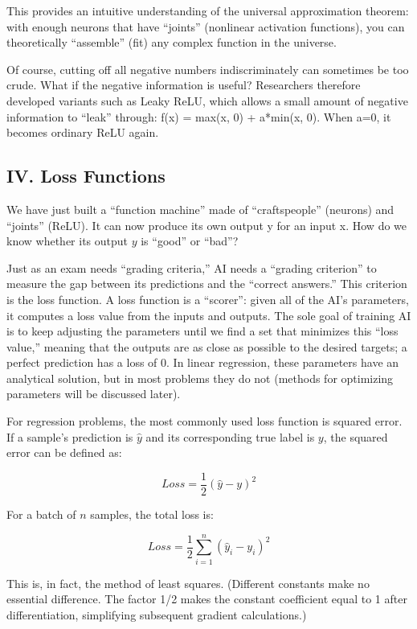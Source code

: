 This provides an intuitive understanding of the universal approximation theorem: with enough neurons that have ``joints'' (nonlinear activation functions), you can theoretically ``assemble'' (fit) any complex function in the universe.

Of course, cutting off all negative numbers indiscriminately can sometimes be too crude. What if the negative information is useful? Researchers therefore developed variants such as Leaky ReLU, which allows a small amount of negative information to ``leak'' through: f(x) = max(x, 0) + a*min(x, 0). When a=0, it becomes ordinary ReLU again.

\hypertarget{iv.-loss-functions}{%
\subsection{IV. Loss Functions}\label{iv.-loss-functions}}

We have just built a ``function machine'' made of ``craftspeople'' (neurons) and ``joints'' (ReLU). It can now produce its own output y for an input x. How do we know whether its output \(y\) is ``good'' or ``bad''?

Just as an exam needs ``grading criteria,'' AI needs a ``grading criterion'' to measure the gap between its predictions and the ``correct answers.'' This criterion is the loss function. A loss function is a ``scorer'': given all of the AI's parameters, it computes a loss value from the inputs and outputs. The sole goal of training AI is to keep adjusting the parameters until we find a set that minimizes this ``loss value,'' meaning that the outputs are as close as possible to the desired targets; a perfect prediction has a loss of 0. In linear regression, these parameters have an analytical solution, but in most problems they do not (methods for optimizing parameters will be discussed later).

For regression problems, the most commonly used loss function is squared error. If a sample's prediction is \(\hat{y}\) and its corresponding true label is \(y\), the squared error can be defined as:

\[
Loss=\frac{1}{2}(\hat{y}-y)^2
\]

For a batch of \(n\) samples, the total loss is:

\[
Loss=\frac{1}{2}\sum_{i=1}^{n}(\hat{y}_i-y_i)^2
\]

This is, in fact, the method of least squares. (Different constants make no essential difference. The factor 1/2 makes the constant coefficient equal to 1 after differentiation, simplifying subsequent gradient calculations.)


